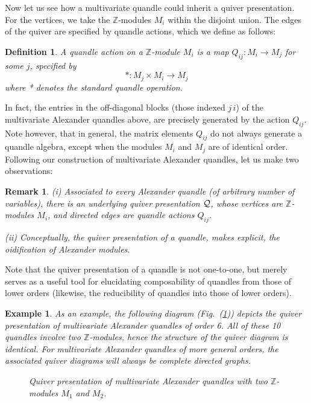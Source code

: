 \documentclass[a4paper,12pt]{article}
\newtheorem{definition}{Definition}[section]
\newtheorem{remark}{Remark}[section]
\newtheorem{example}{Example}[section]
\newcommand{\Z}{\mathbb{Z}}
\begin{document}
Now let us see how a multivariate quandle could inherit a quiver presentation. For the vertices, we take the  $\Z$-modules $M_i$ within the disjoint union. The edges of the quiver are specified by quandle actions, which we define as follows:  
\begin{definition}  
A quandle action on a $\Z$-module $M_i$ is a map $Q_{i j} : M_i \to M_j$ for some $j$, specified by 
\[  * : M_j \times M_i \to M_j    \]
where * denotes the standard quandle operation.
\end{definition}  
In fact, the entries in the off-diagonal blocks (those indexed $j\,i$) of the multivariate Alexander quandles above, are precisely generated by the action  $Q_{i j}$.  Note however, that in general, the matrix elements $Q_{i j}$ do not always generate a quandle algebra, except when the modules $M_i$ and $M_j$ are of identical order. Following our construction of multivariate Alexander quandles, let us make two observations:   
\begin{remark} 
(i) Associated to every Alexander quandle (of arbitrary number of variables), there is an underlying quiver presentation ${\cal Q}$, whose vertices are $\Z$-modules $M_i$, and directed edges are quandle actions $Q_{i j}$. 

(ii) Conceptually, the quiver presentation of a quandle, makes explicit, the oidification of Alexander modules.   
\end{remark} 
Note that the quiver presentation of a quandle is not one-to-one, but merely  serves as a useful tool for elucidating composability of quandles from those of lower orders (likewise, the reducibility of quandles into those of lower orders). 

\begin{example}
As an example, the following diagram (Fig.~(\ref{qfig0})) depicts the quiver presentation of  multivariate Alexander quandles of order 6. All of these 10 quandles involve two $\Z$-modules, hence the structure of the quiver diagram is identical. For multivariate Alexander quandles of more general orders, the associated quiver diagrams will always be complete directed  graphs. 

\begin{figure}[htbp]
\begin{center}
\caption{Quiver presentation of multivariate Alexander quandles with two  $\Z$-modules $M_1$ and $M_2$. }  
\label{qfig0}   
\end{center}  
\end{figure}

\end{example}
\end{document}
